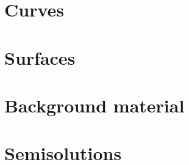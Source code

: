 \documentclass[twoside]{book}
\begin{document}


\part{Curves}






\part{Surfaces}


   

%
%


%

%
%

\part{Background material}

\appendix



\part{Semisolutions}




\sloppy
\printbibliography[heading=bibintoc]
\fussy
\end{document}
